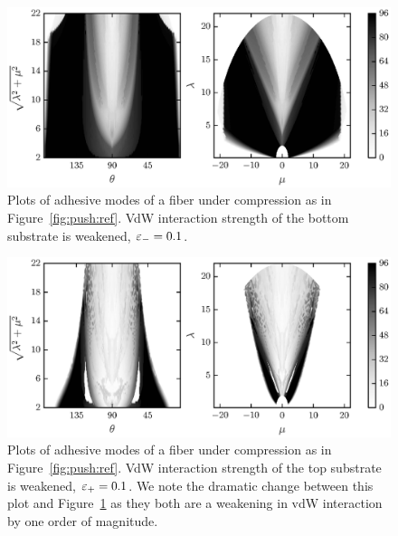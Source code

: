	\begin{figure}[t]
		\begin{center}
			\includegraphics{./fig/ch3/push/eb0.1/grid.eps}
		\end{center}		
		\caption{Plots of adhesive modes of a fiber under compression as in Figure~\ref{fig:push:ref}. VdW interaction strength of the bottom substrate is weakened, $\varepsilon_-=0.1$.
		\label{fig:push:eb0.1}}
	\end{figure}	

	\begin{figure}[t]
		\begin{center}
			\includegraphics{./fig/ch3/push/et0.1/grid.eps}
		\end{center}		
		\caption{Plots of adhesive modes of a fiber under compression as in Figure~\ref{fig:push:ref}. VdW interaction strength of the top substrate is weakened, $\varepsilon_+=0.1$. We note the dramatic change between this plot and Figure~\ref{fig:push:eb0.1} as they both are a weakening in vdW interaction by one order of magnitude.
		\label{fig:push:et0.1}}
	\end{figure}


